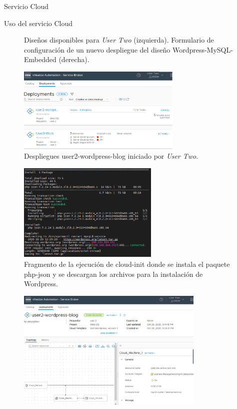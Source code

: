 \begin{subsection}{Servicio Cloud}
\begin{subsubsection}{Uso del servicio Cloud}
\begin{figure}[h]
            \caption{Diseños disponibles para \textit{User Two} (izquierda). Formulario de configuración de un nuevo despliegue del diseño Wordpress-MySQL-Embedded (derecha).}
            \label{fig:catalog-user-2}
        \end{figure}
        \FloatBarrier
        \begin{figure}[h]
            \centering
            \includegraphics[width=0.7\textwidth]{imaxes/pruebaconcepto/vrealize/user-2-card-deploy.png}
            \caption{Despliegues user2-wordpress-blog iniciado por \textit{User Two}.}
            \label{fig:deployment-user-2}
        \end{figure}
        \FloatBarrier
        \begin{figure}[h]
            \centering
            \includegraphics[width=0.6\textwidth]{imaxes/pruebaconcepto/vrealize/cloud-init-commands-wordpress.png}
            \caption{Fragmento de la ejecución de cloud-init donde se instala el paquete php-json y se descargan los archivos para la instalación de Wordpress.}
            \label{fig:cloud-init-user-2}
        \end{figure}
        \FloatBarrier
        \begin{figure}[h]
            \centering
            \includegraphics[width=0.8\textwidth]{imaxes/pruebaconcepto/vrealize/user-2-deploy-fin.png}

\end{figure}
\end{subsubsection}
\end{subsection}
